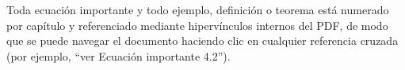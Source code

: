 Toda ecuación importante y todo ejemplo, definición o teorema está numerado por capítulo y referenciado mediante hipervínculos internos del PDF, de modo que se puede navegar el documento haciendo clic en cualquier referencia cruzada (por ejemplo, ``ver \textcolor{ucblue}{Ecuación importante 4.2}'').
